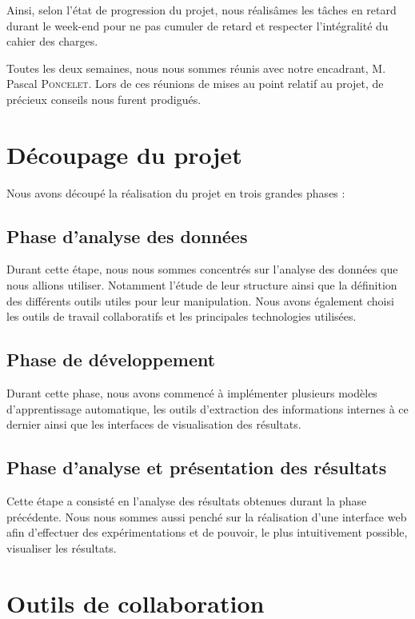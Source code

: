 \documentclass[oneside,13pt,a4paper]{report}
\begin{document}
Ainsi, selon l'état de progression du projet, nous réalisâmes les tâches en retard durant le week-end pour ne pas cumuler de retard et respecter l'intégralité du cahier des charges.

Toutes les deux semaines, nous nous sommes réunis avec notre encadrant, M. Pascal \textsc{Poncelet}. Lors de ces réunions de mises au point relatif au projet, de précieux conseils nous furent prodigués.

\section{Découpage du projet}

Nous avons découpé la réalisation du projet en trois grandes phases :

\subsection{Phase d'analyse des données}

Durant cette étape, nous nous sommes concentrés sur l'analyse des données que nous allions utiliser. Notamment l'étude de leur structure ainsi que la définition des différents outils utiles pour leur manipulation. Nous avons également choisi les outils de travail collaboratifs et les principales technologies utilisées.

\subsection{Phase de développement}

Durant cette phase, nous avons commencé à implémenter plusieurs modèles d'apprentissage automatique, les outils d'extraction des informations internes à ce dernier ainsi que les interfaces de visualisation des résultats.

\subsection{Phase d'analyse et présentation des résultats}

Cette étape a consisté en l'analyse des résultats obtenues durant la phase précédente. Nous nous sommes aussi penché sur la réalisation d'une interface web afin d'effectuer des expérimentations et de pouvoir, le plus intuitivement possible, visualiser les résultats.

\section{Outils de collaboration}
\end{document}
